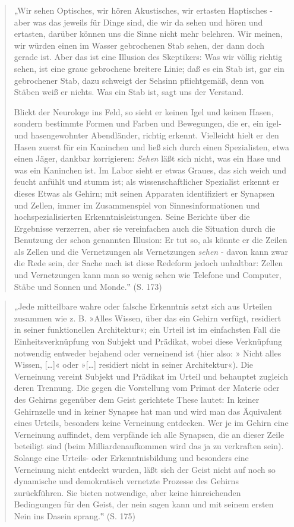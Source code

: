 \documentclass[
  a4paper,
]{report}
\begin{document}
\begin{quote}
„Wir sehen Optisches, wir hören Akustisches, wir ertasten Haptisches - aber was das jeweils für Dinge sind, die wir da sehen und hören und ertasten, darüber können uns die Sinne nicht mehr belehren. Wir meinen, wir würden einen im Wasser gebrochenen Stab sehen, der dann doch gerade ist. Aber das ist eine Illusion des Skeptikers: Was wir völlig richtig sehen, ist eine graue gebrochene breitere Linie; daß es ein Stab ist, gar ein gebrochener Stab, dazu schweigt der Sehsinn pflichtgemäß, denn von Stäben weiß er nichts. Was ein Stab ist, sagt uns der Verstand.

Blickt der Neurologe ins Feld, so sieht er keinen Igel und keinen Hasen, sondern bestimmte Formen und Farben und Bewegungen, die er, ein igel- und hasengewohnter Abendländer, richtig erkennt. Vielleicht hielt er den Hasen zuerst für ein Kaninchen und ließ sich durch einen Spezialisten, etwa einen Jäger, dankbar korrigieren: \emph{Sehen} läßt sich nicht, was ein Hase und was ein Kaninchen ist. Im Labor sieht er etwas Graues, das sich weich und feucht anfühlt und stumm ist; als wissenschaftlicher Spezialist erkennt er dieses Etwas als Gehirn; mit seinen Apparaten identifiziert er Synapsen und Zellen, immer im Zusammenspiel von Sinnesinformationen und hochspezialisierten Erkenntnisleistungen. Seine Berichte über die Ergebnisse verzerren, aber sie vereinfachen auch die Situation durch die Benutzung der schon genannten Illusion: Er tut so, als könnte er die Zeilen als Zellen und die Vernetzungen als Vernetzungen \emph{sehen} - davon kann zwar die Rede sein, der Sache nach ist diese Redeform jedoch unhaltbar: Zellen und Vernetzungen kann man so wenig sehen wie Telefone und Computer, Stäbe und Sonnen und Monde.‟ (S. 173)
\end{quote}

\begin{quote}
„Jede mitteilbare wahre oder falsche Erkenntnis setzt sich aus Urteilen zusammen wie z. B. »Alles Wissen, über das ein Gehirn verfügt, residiert in seiner funktionellen Architektur«; ein Urteil ist im einfachsten Fall die Einheitsverknüpfung von Subjekt und Prädikat, wobei diese Verknüpfung notwendig entweder bejahend oder verneinend ist (hier also: » Nicht alles Wissen, {[}\ldots{]}« oder »{[}\ldots{]} residiert nicht in seiner Architektur«). Die Verneinung vereint Subjekt und Prädikat im Urteil und behauptet zugleich deren Trennung. Die gegen die Vorstellung vom Primat der Materie oder des Gehirns gegenüber dem Geist gerichtete These lautet: In keiner Gehirnzelle und in keiner Synapse hat man und wird man das Äquivalent eines Urteils, besonders keine Verneinung entdecken. Wer je im Gehirn eine Verneinung auffindet, dem verpfände ich alle Synapsen, die an dieser Zeile beteiligt sind (beim Milliardenaufkommen wird das ja zu verkraften sein). Solange eine Urteils- oder Erkenntnisbildung und besonders eine Verneinung nicht entdeckt wurden, läßt sich der Geist nicht auf noch so dynamische und demokratisch vernetzte Prozesse des Gehirns zurückführen. Sie bieten notwendige, aber keine hinreichenden Bedingungen für den Geist, der nein sagen kann und mit seinem ersten Nein ins Dasein sprang.‟ (S. 175)
\end{quote}
\end{document}
